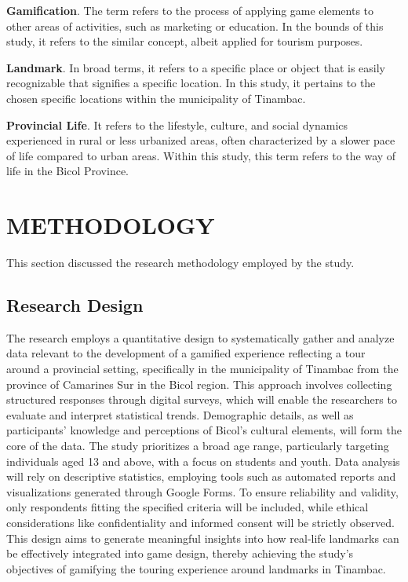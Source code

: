 \documentclass[11pt]{research}
\begin{document}
\textbf{Gamification}. The term refers to the process of applying game elements to other areas of activities, such as marketing or education. In the bounds of this study, it refers to the similar concept, albeit applied for tourism purposes.

\textbf{Landmark}. In broad terms, it refers to a specific place or object that is easily recognizable that signifies a specific location. In this study, it pertains to the chosen specific locations within the municipality of Tinambac.

\textbf{Provincial Life}. It refers to the lifestyle, culture, and social dynamics experienced in rural or less urbanized areas, often characterized by a slower pace of life compared to urban areas. Within this study, this term refers to the way of life in the Bicol Province.


\chapter{METHODOLOGY}
This section discussed the research methodology employed by the study.

\section{Research Design}
The research employs a quantitative design to systematically gather and analyze data relevant to the development of a gamified experience reflecting a tour around a provincial setting, specifically in the municipality of Tinambac from the province of Camarines Sur in the Bicol region. This approach involves collecting structured responses through digital surveys, which will enable the researchers to evaluate and interpret statistical trends. Demographic details, as well as participants' knowledge and perceptions of Bicol’s cultural elements, will form the core of the data. The study prioritizes a broad age range, particularly targeting individuals aged 13 and above, with a focus on students and youth. Data analysis will rely on descriptive statistics, employing tools such as automated reports and visualizations generated through Google Forms. To ensure reliability and validity, only respondents fitting the specified criteria will be included, while ethical considerations like confidentiality and informed consent will be strictly observed. This design aims to generate meaningful insights into how real-life landmarks can be effectively integrated into game design, thereby achieving the study's objectives of gamifying the touring experience around landmarks in Tinambac.
\end{document}
